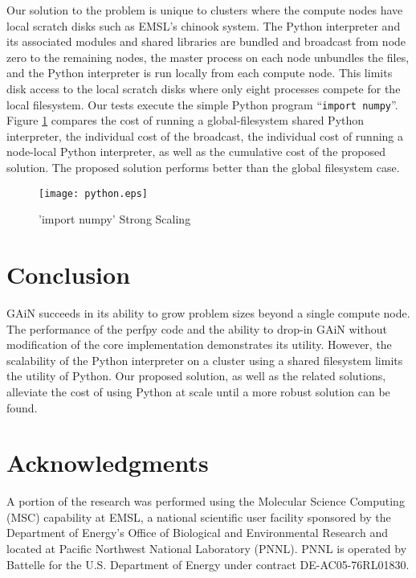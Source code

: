 \documentclass{sig-alt-release2}
\begin{document}
Our solution to the problem is unique to clusters where the compute nodes have
local scratch disks such as EMSL's chinook system. The Python interpreter and
its associated modules and shared libraries are bundled and broadcast from node
zero to the remaining nodes, the master process on each node unbundles the
files, and the Python interpreter is run locally from each compute node. This
limits disk access to the local scratch disks where only eight processes
compete for the local filesystem. Our tests execute the simple Python program
``\texttt{import numpy}''. Figure \ref{fig:python} compares the cost of running
a global-filesystem shared Python interpreter, the individual cost of the
broadcast, the individual cost of running a node-local Python interpreter, as
well as the cumulative cost of the proposed solution. The proposed solution
performs better than the global filesystem case.

\begin{figure}
\centering
\texttt{[image: python.eps]}
\caption{'import numpy' Strong Scaling}
\label{fig:python}
\end{figure}

\section{Conclusion}
GAiN succeeds in its ability to grow problem sizes beyond a single compute
node. The performance of the perfpy code and the ability to drop-in GAiN
without modification of the core implementation demonstrates its utility. However, the scalability of the Python interpreter on a cluster using a shared filesystem limits the utility of Python. Our proposed solution, as well as the related solutions\cite{Scu11,Man11}, alleviate the cost of using Python at scale until a more robust solution can be found.

\section{Acknowledgments}
A portion of the research was performed using the Molecular Science Computing
(MSC) capability at EMSL, a national scientific user facility sponsored by the
Department of Energy's Office of Biological and Environmental Research and
located at Pacific Northwest National Laboratory (PNNL). PNNL is operated by
Battelle for the U.S. Department of Energy under contract DE-AC05-76RL01830.

%


%
%
\end{document}
